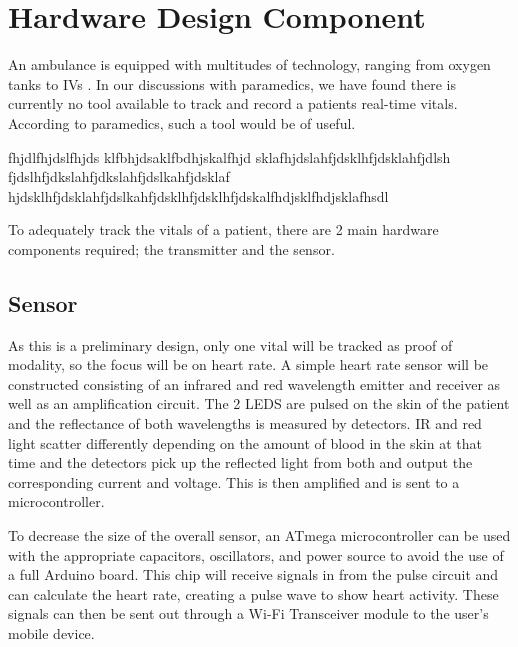 
\section{Hardware Design Component}

An ambulance is equipped with multitudes of technology, ranging from oxygen tanks to IVs \cite{AmericanCollegeofSurgeonsCommitteeonTrauma}. In our discussions with paramedics, we have found there is currently no tool available to track and record a patients real-time vitals. According to paramedics, such a tool would be of useful.

fhjdlfhjdslfhjds
klfbhjdsaklfbdhjskalfhjd
sklafhjdslahfjdsklhfjdsklahfjdlsh
fjdslhfjdkslahfjdkslahfjdslkahfjdsklaf
hjdsklhfjdsklahfjdslkahfjdsklhfjdsklhfjdskalfhdjsklfhdjsklafhsdl

To adequately track the vitals of a patient, there are 2 main hardware components required; the transmitter and the sensor.

\subsection{Sensor}
As this is a preliminary design, only one vital will be tracked as proof of modality, so the focus will be on heart rate.
A simple heart rate sensor will be constructed consisting of an infrared and red wavelength emitter and receiver as well as an amplification circuit.
The 2 LEDS are pulsed on the skin of the patient and the reflectance of both wavelengths is measured by detectors. IR and red light scatter differently
depending on the amount of blood in the skin at that time and the detectors pick up the reflected light from both and output the corresponding current and
voltage. This is then amplified and is sent to a microcontroller.

To decrease the size of the overall sensor, an ATmega microcontroller can be used with the appropriate capacitors, oscillators, and power source to avoid the
use of a full Arduino board. This chip will receive signals in from the pulse circuit and can calculate the heart rate, creating a pulse wave to show heart activity. These signals can then be sent out through a Wi-Fi Transceiver module to the user’s mobile device.
